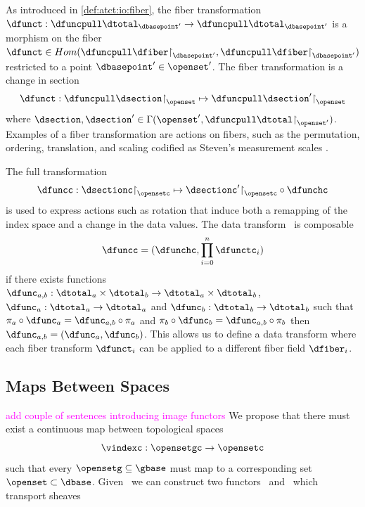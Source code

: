 \documentclass[10pt,journal,compsoc]{IEEEtran}
\newcommand{\note}[1]{\textcolor{magenta}{#1}}
\renewcommand{\restriction}{\mathord{\upharpoonright}} %
\theoremstyle{definition}
\theoremstyle{remark}
\begin{document}
As introduced in \autoref{def:atct:io:fiber}, the fiber transformation $\dfunct: \dfuncpull \dtotal_{\dbasepoint^{\prime}} \rightarrow \dfuncpull \dtotal_{\dbasepoint^{\prime}}$ is a morphism on the fiber $\dfunct \in Hom(\dfuncpull\dfiber\restriction_{\dbasepoint^{\prime}},\dfuncpull\dfiber\restriction_{\dbasepoint^{\prime}})$ restricted to a point $\dbasepoint^{\prime} \in \openset^{\prime}$. The fiber transformation is a change in section 
\begin{equation}
  \dfunct: \dfuncpull \dsection \restriction_{\openset} \mapsto \dfuncpull \dsection^{\prime} \restriction_{\openset}
\end{equation}
where $\dsection, \dsection^{\prime} \in \Gamma(\openset^{\prime}, \dfuncpull\dtotal\restriction_{\openset^{\prime}})$. Examples of a fiber transformation are actions on fibers, such as the permutation, ordering, translation, and scaling codified as Steven's measurement scales \cite{stevensTheoryScalesMeasurement1946}. 

The full transformation 
\begin{equation}
  \dfuncc: \dsectionc\restriction_{\opensetc} \mapsto \dsectionc^{\prime}\restriction_{\opensetc} \circ \dfunchc
\end{equation}
is used to express actions such as rotation that induce both a remapping of the index space and a change in the data values. The data transform \dfunc\ is composable
\begin{equation}
  \dfuncc = (\dfunchc, \prod\limits_{i=0}^{n}\dfunctc_i)
\end{equation}
if there exists functions $\dfunc_{a,b}: \dtotal_a \times \dtotal_b \rightarrow \dtotal_a \times \dtotal_b$, $\dfunc_{a}: \dtotal_a \rightarrow \dtotal_a$ and $\dfunc_{b}: \dtotal_b \rightarrow \dtotal_b$ such that $\pi_a \circ \dfunc_a = \dfunc_{a,b} \circ \pi_a$ and $\pi_b \circ \dfunc_b = \dfunc_{a,b} \circ \pi_b$ then $\dfunc_{a,b} = (\dfunc_a, \dfunc_b)$. This allows us to define a data transform where each fiber transform $\dfunct_{i}$ can be applied to a different fiber field $\dfiber_i$. 

\subsection{Maps Between Spaces}
\note{add couple of sentences introducing image functors}
We propose that there must exist a continuous \textcolor{functor}{map between topological spaces} \vindexc 
\begin{equation}
  \vindexc: \opensetgc \rightarrow \opensetc 
\end{equation}
such that every $\opensetg \subseteq \gbase$ must map to a corresponding set $\openset \subset \dbase$. Given \vindex\ we can construct two functors \vindexpull\ and \vindexpush\ which transport sheaves 
\end{document}
